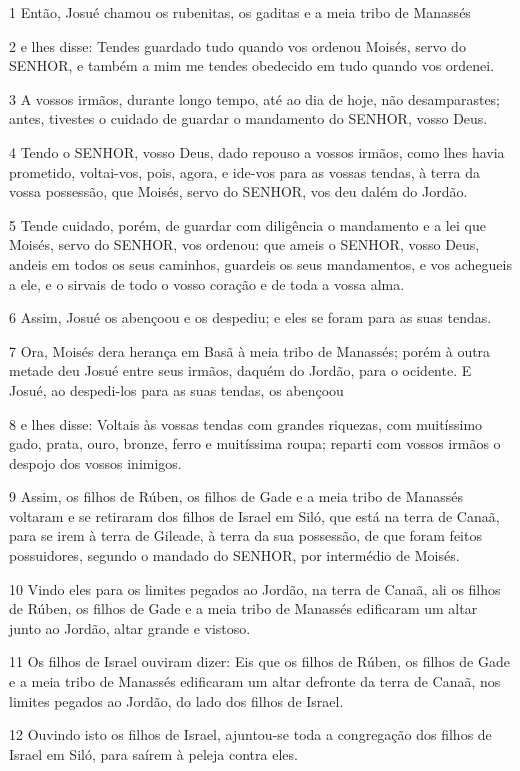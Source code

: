 \par 1 Então, Josué chamou os rubenitas, os gaditas e a meia tribo de Manassés
\par 2 e lhes disse: Tendes guardado tudo quando vos ordenou Moisés, servo do SENHOR, e também a mim me tendes obedecido em tudo quando vos ordenei.
\par 3 A vossos irmãos, durante longo tempo, até ao dia de hoje, não desamparastes; antes, tivestes o cuidado de guardar o mandamento do SENHOR, vosso Deus.
\par 4 Tendo o SENHOR, vosso Deus, dado repouso a vossos irmãos, como lhes havia prometido, voltai-vos, pois, agora, e ide-vos para as vossas tendas, à terra da vossa possessão, que Moisés, servo do SENHOR, vos deu dalém do Jordão.
\par 5 Tende cuidado, porém, de guardar com diligência o mandamento e a lei que Moisés, servo do SENHOR, vos ordenou: que ameis o SENHOR, vosso Deus, andeis em todos os seus caminhos, guardeis os seus mandamentos, e vos achegueis a ele, e o sirvais de todo o vosso coração e de toda a vossa alma.
\par 6 Assim, Josué os abençoou e os despediu; e eles se foram para as suas tendas.
\par 7 Ora, Moisés dera herança em Basã à meia tribo de Manassés; porém à outra metade deu Josué entre seus irmãos, daquém do Jordão, para o ocidente. E Josué, ao despedi-los para as suas tendas, os abençoou
\par 8 e lhes disse: Voltais às vossas tendas com grandes riquezas, com muitíssimo gado, prata, ouro, bronze, ferro e muitíssima roupa; reparti com vossos irmãos o despojo dos vossos inimigos.
\par 9 Assim, os filhos de Rúben, os filhos de Gade e a meia tribo de Manassés voltaram e se retiraram dos filhos de Israel em Siló, que está na terra de Canaã, para se irem à terra de Gileade, à terra da sua possessão, de que foram feitos possuidores, segundo o mandado do SENHOR, por intermédio de Moisés.
\par 10 Vindo eles para os limites pegados ao Jordão, na terra de Canaã, ali os filhos de Rúben, os filhos de Gade e a meia tribo de Manassés edificaram um altar junto ao Jordão, altar grande e vistoso.
\par 11 Os filhos de Israel ouviram dizer: Eis que os filhos de Rúben, os filhos de Gade e a meia tribo de Manassés edificaram um altar defronte da terra de Canaã, nos limites pegados ao Jordão, do lado dos filhos de Israel.
\par 12 Ouvindo isto os filhos de Israel, ajuntou-se toda a congregação dos filhos de Israel em Siló, para saírem à peleja contra eles.
